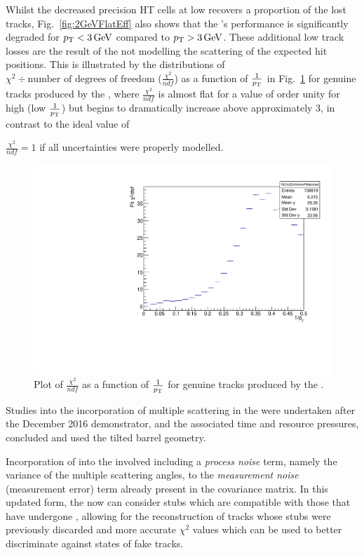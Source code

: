 Whilst the decreased precision HT cells at low \pT recovers a proportion of the lost tracks, Fig.~\ref{fig:2GeVFlatEff}  also shows that the \KF's performance is significantly degraded for $p_{\mathrm{T}} < 3 \,\text{Ge\hspace{-.08em}V}$ compared to $p_{\mathrm{T}} > 3 \,\text{Ge\hspace{-.08em}V}$.
These additional low \pT track losses are the result of the \KF not modelling the scattering of the expected hit positions.
This is illustrated by the distributions of $\chi^{2} \div \text{number of degrees of freedom}$ ($\frac{\chi^{2}}{ndf}$) as a function of $\frac{1}{p_{\mathrm{T}}}$ in Fig.~\ref{fig:2GeVFlatChi2Ndf} for genuine tracks produced by the \KF, where $\frac{\chi^{2}}{ndf}$ is almost flat for a value of order unity for high \pT (low $\frac{1}{p_{\mathrm{T}}}$) but begins to dramatically increase above approximately 3\GeV, in contrast to the ideal value of {$\frac{\chi^{2}}{ndf} = 1$ if all uncertainties were properly modelled.

\begin{figure}[tbp]
\centering
\includegraphics[width=\textwidth]{figs/tk-upgrade/results-lowPtTracking/kfChi2NdfVsInvPtFlatGeometry_5000.pdf}
\caption{Plot of $\frac{\chi^{2}}{ndf}$ as a function of $\frac{1}{p_{\mathrm{T}}}$ for genuine tracks produced by the \KF.}
\label{fig:2GeVFlatChi2Ndf}
\end{figure}

Studies into the incorporation of multiple scattering in the \KF were undertaken after the December 2016 demonstrator, and the associated time and resource pressures, concluded and used the tilted barrel geometry.

Incorporation of \MS into the \KF involved including a \emph{process noise} term, namely the variance of the multiple scattering angles, to the \emph{measurement noise} (\ie measurement error) term already present in the \KF covariance matrix.
In this updated form, the \KF now can consider stubs which are compatible with those that have undergone \MS, allowing for the reconstruction of tracks whose stubs were previously discarded and more accurate $\chi^{2}$ values which can be used to better discriminate against states of fake tracks.

}
